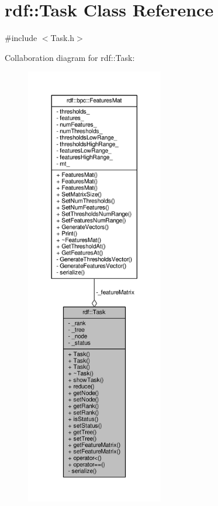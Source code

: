 \hypertarget{classrdf_1_1Task}{}\section{rdf\+:\+:Task Class Reference}
\label{classrdf_1_1Task}


{\ttfamily \#include $<$Task.\+h$>$}



Collaboration diagram for rdf\+:\+:Task\+:
\nopagebreak
\begin{figure}[H]
\begin{center}
\leavevmode
\includegraphics[height=550pt]{classrdf_1_1Task__coll__graph}
\end{center}
\end{figure}
